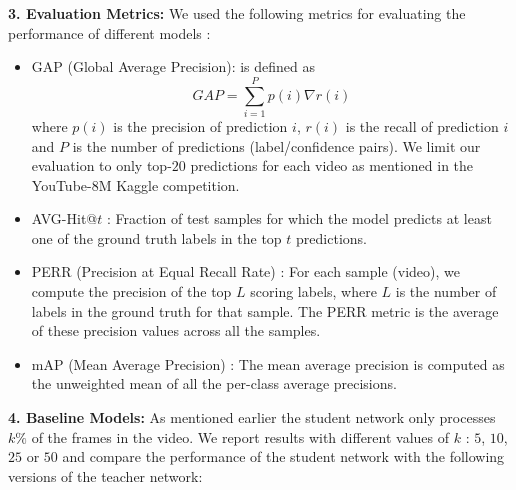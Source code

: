 \documentclass[10pt,twocolumn,letterpaper]{article}
\begin{document}
\noindent \textbf{3. Evaluation Metrics:} We used the following metrics for evaluating the performance of different models \cite{Youtube8M}:
\begin{itemize}[leftmargin=*,noitemsep]
\item GAP (Global Average Precision): is defined as
\[GAP = \sum_{i=1}^{P} p(i) \nabla r(i)\]
where $p(i)$ is the precision of prediction $i$, $r(i)$ is the
recall of prediction $i$ and $P$ is the number of predictions
(label/confidence pairs). We limit our evaluation to only top-$20$ predictions for each video as mentioned in the YouTube-8M
Kaggle competition.
\item AVG-Hit@$t$ : Fraction of test samples for which the model predicts at least
one of the ground truth labels in the top $t$ predictions. 
\item PERR (Precision at Equal Recall Rate) : For each sample (video), we compute the precision of the top $L$ scoring labels, where $L$ is the number of labels in the ground truth for that sample. The PERR metric is the average of these precision values across all the samples.  
\item mAP (Mean Average Precision) : The mean average precision is computed
as the unweighted mean of all the per-class average precisions.
\end{itemize}
\noindent \textbf{4. Baseline Models:} As mentioned earlier the student network only processes $k\%$ of the frames in the video. We report results with different values of $k$ : $5$, $10$, $25$ or $50$ and compare the performance of the student network with the following versions of the teacher network:
\end{document}
